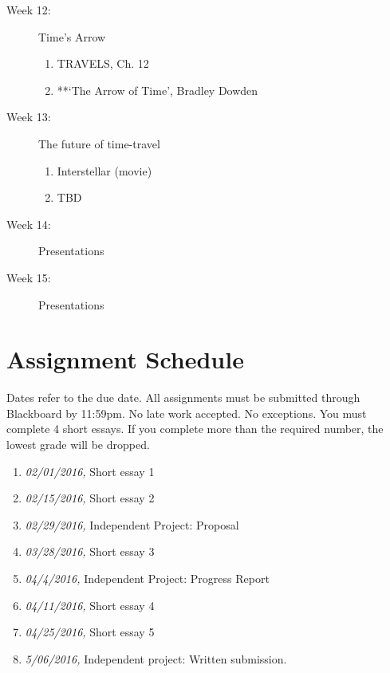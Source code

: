 \documentclass[article,oneside]{memoir}
\begin{document}
\begin{description}
\item[Week 12:] Time's Arrow
\begin{enumerate}
\item TRAVELS, Ch. 12
\item **`The Arrow of Time', Bradley Dowden
\end{enumerate}


\item[Week 13:]  The future of time-travel
\begin{enumerate}
\item Interstellar (movie)
\item TBD
\end{enumerate}



\item[Week 14:] Presentations




\item[Week 15:] Presentations
 \end{description}

\section{ Assignment Schedule}
Dates refer to the due date. All assignments must be submitted through Blackboard by 11:59pm. No late work accepted. No exceptions. You must complete 4 short essays. If you complete more than the required number, the lowest grade will be dropped.
\begin{enumerate}
\item \textit{02/01/2016,} Short essay 1
\item \textit{02/15/2016,} Short essay 2
\item \textit{02/29/2016,} Independent Project: Proposal
\item \textit{03/28/2016,} Short essay 3
\item \textit{04/4/2016,} Independent Project: Progress Report
\item \textit{04/11/2016,} Short essay 4
\item \textit{04/25/2016,} Short essay 5
\item \textit{5/06/2016,} Independent project: Written submission.
\end{enumerate}




\end{document}
